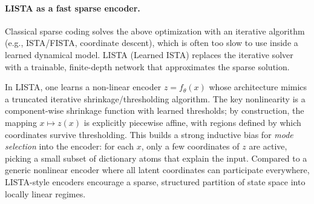 \paragraph{LISTA as a fast sparse encoder.}
Classical sparse coding solves the above optimization with an iterative algorithm (e.g., ISTA/FISTA, coordinate descent), which is often too slow to use inside a learned dynamical model.
LISTA (Learned ISTA) \citep{gregor_learning_2010} replaces the iterative solver with a trainable, finite-depth network that approximates the sparse solution.

In LISTA, one learns a non-linear encoder $z = f_\theta(x)$ whose architecture mimics a truncated iterative shrinkage/thresholding algorithm.
The key nonlinearity is a component-wise shrinkage function with learned thresholds; by construction, the mapping $x \mapsto z(x)$ is explicitly piecewise affine, with regions defined by which coordinates survive thresholding.
This builds a strong inductive bias for \emph{mode selection} into the encoder: for each $x$, only a few coordinates of $z$ are active, picking a small subset of dictionary atoms that explain the input.
Compared to a generic nonlinear encoder where all latent coordinates can participate everywhere, LISTA-style encoders encourage a sparse, structured partition of state space into locally linear regimes.




